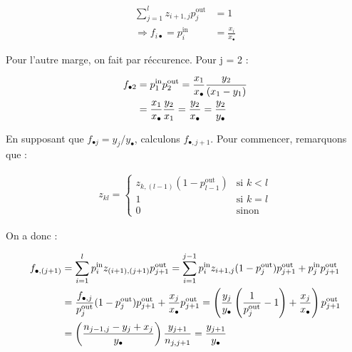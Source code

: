 \documentclass[11p]{article}
\begin{document}
\begin{align}
\sum_{j=1}^l z_{i+1, j} p^\text{out}_j &= 1 \\
\Rightarrow f_{i \bullet} = p^\text{in}_i &= \frac{x_i}{x_\bullet}
\end{align}

Pour l'autre marge, on fait par réccurence. Pour j = 2 :

\begin{align}
f_{\bullet 2} &= p^\text{in}_1 p^\text{out}_2 = \frac{x_1}{x_\bullet} \frac{y_2}{(x_1 - y_1)} \notag \\
			  &= \frac{x_1}{x_\bullet} \frac{y_2}{x_1} = \frac{y_2}{x_\bullet} = \frac{y_2}{y_\bullet}
\end{align}

En supposant que $f_{\bullet j} = y_j / y_\bullet$, calculons $f_{\bullet, j+1}$. Pour commencer, remarquons que :

\begin{align}
z_{kl} = \begin{cases}
z_{k, (l-1)} (1 - p^\text{out}_{l-1}) & \text{si } k < l \\
1 & \text{si } k = l \\
0 & \text{sinon}
\end{cases}
\end{align}

On a donc :

\begin{align}
f_{\bullet, (j+1)} &= \sum_{i=1}^l p^\text{in}_i z_{(i+1), (j+1)} p^\text{out}_{j+1} = \sum_{i=1}^{j-1} p^\text{in}_i z_{i+1, j} (1 - p^\text{out}_{j}) p^\text{out}_{j+1} + p^\text{in}_j p^\text{out}_{j+1} \notag \\
&= \frac{f_{\bullet, j}}{p^\text{out}_j}(1 - p^\text{out}_j)p^\text{out}_{j+1} + \frac{x_j}{x_\bullet} p^\text{out}_{j+1} = \left( \frac{y_j}{y_\bullet} \left( \frac{1}{p^\text{out}_j} - 1 \right)+ \frac{x_j}{x_\bullet} \right) p^\text{out}_{j+1} \notag \\
&= \left( \frac{n_{j-1,j} - y_j + x_j}{y_\bullet} \right) \frac{y_{j+1}}{n_{j,j+1}} = \frac{y_{j+1}}{y_\bullet}
\end{align}
\end{document}
